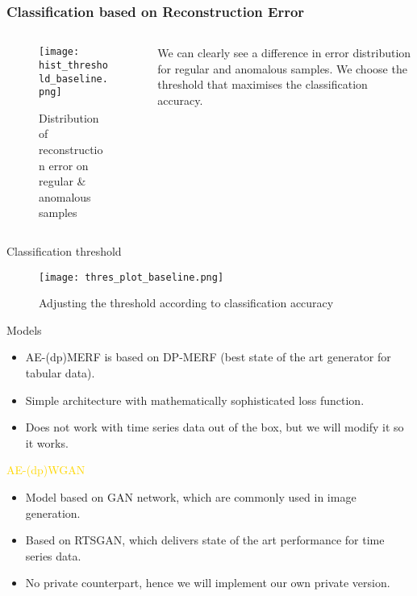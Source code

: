 \begin{frame}
    \frametitle{Classification based on Reconstruction Error}

    \begin{columns}
        \begin{column}{0.48\textwidth}
        \begin{figure}
            \centering
            \texttt{[image: hist\_threshold\_baseline.png]}
            \caption{Distribution of reconstruction error on regular \& anomalous samples}
        \end{figure}
    \end{column}
    \begin{column}{0.48\textwidth}
        We can clearly see a \alert{difference in error distribution} for regular and anomalous samples. We choose the \alert{threshold that maximises the classification} accuracy.
    \end{column}
    \end{columns}

\end{frame}

\begin{frame}{Classification threshold}
    \begin{figure}
        \centering
        \texttt{[image: thres\_plot\_baseline.png]}
        \caption{Adjusting the threshold according to classification accuracy}
        \label{fig:enter-label}
    \end{figure}
\end{frame}


\begin{frame}{Models}
    \begin{itemize}
        \item AE-(dp)MERF is based on DP-MERF (best state of the art generator for tabular data).
        \item Simple architecture with mathematically sophisticated loss function.
        \item Does not work with time series data out of the box, but we will modify it so it works.
    \end{itemize}
    {\textcolor{gold}{AE-(dp)WGAN}}
    \begin{itemize}
        \item Model based on GAN network, which are commonly used in image generation.
        \item Based on RTSGAN, which delivers state of the art performance for time series data.
        \item No private counterpart, hence we will implement our own private version.
    \end{itemize}
    
\end{frame}

